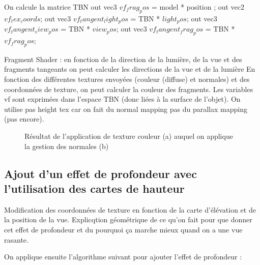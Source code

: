 \documentclass[a4paper]{article}
\begin{document}
On calcule la matrice TBN 
out vec3 $vf_frag_pos$ = model * position ;
out vec2 $vf_tex_coords$;
out vec3 $vf_tangent_light_pos$ = TBN * $light_pos$;
out vec3 $vf_tangent_view_pos$ = TBN * $view_pos$;
out vec3 $vf_tangent_frag_pos$ = TBN * $vf_frag_pos$;

Fragment Shader : en fonction de la direction de la lumière, de la vue et des fragments tangeants on peut calculer les directions de la vue et de la lumière 
En fonction des différentes textures envoyées (couleur (diffuse) et normales) et des coordonnées de texture, on peut calculer la couleur des fragments.
Les variables vf sont exprimées dans l'espace TBN (donc liées à la surface de l'objet). 
On utilise pas height tex car on fait du normal mapping pas du parallax mapping (pas encore).

\begin{figure}[H]
\centering
{}
\caption{Résultat de l'application de texture couleur (a) auquel on applique la gestion des normales (b)}
\end{figure}


\subsection{Ajout d'un effet de profondeur avec l'utilisation des cartes de hauteur}
Modification des coordonnées de texture en fonction de la carte d'élévation et de la position de la vue. Explicqtion géométrique de ce qu'on fait pour que donner cet effet de profondeur et du pourquoi ça marche mieux quand on a une vue rasante. 

On applique ensuite l'algorithme suivant pour ajouter l'effet de profondeur : 
\end{document}
